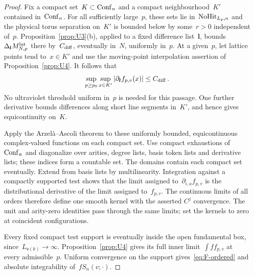 \begin{proof}
Fix a compact set~$K\subset\mathrm{Conf}_{n}$ and a compact neighbourhood~$K'$ contained in~$\mathrm{Conf}_{n}$. For all sufficiently large~$p$, these sets lie in~$\mathrm{NoHit}_{L_p,n}$ and the physical torus separation on~$K'$ is bounded below by some~$r>0$ independent of~$p$. Proposition~\ref{prop:U3}(b), applied to a fixed difference list~$\boldsymbol l$, bounds~$\Delta_{\boldsymbol l}M^{\mathrm{lat}}_{N,p}$ there by~$C_{\rm diff}$, eventually in~$N$, uniformly in~$p$. At a given~$p$, let lattice points tend to~$x\in K'$ and use the moving-point interpolation assertion of Proposition~\ref{prop:U4}. It follows that
\begin{equation}\label{eq:F-local-bounds}
\sup_{p\ge p_0}\sup_{x\in K'}|\partial_{\boldsymbol l}f_{p,v}(x)|\le C_{\rm diff}\,.
\end{equation}
No ultraviolet threshold uniform in~$p$ is needed for this passage. One further derivative bounds differences along short line segments in~$K'$, and hence gives equicontinuity on~$K$.

Apply the Arzelà--Ascoli theorem to these uniformly bounded, equicontinuous complex-valued functions on each compact set. Use compact exhaustions of~$\mathrm{Conf}_{n}$ and diagonalize over arities, degree lists, basis token lists and derivative lists; these indices form a countable set. The domains contain each compact set eventually. Extend from basis lists by multilinearity. Integration against a compactly supported test shows that the limit assigned to~$\partial_{i,a}f_{p,v}$ is the distributional derivative of the limit assigned to~$f_{p,v}$. The continuous limits of all orders therefore define one smooth kernel with the asserted $C^j$ convergence. The unit and arity-zero identities pass through the same limits; set the kernels to zero at coincident configurations.

Every fixed compact test support is eventually inside the open fundamental box, since~$L_{\mathsf v(k)}\to\infty$. Proposition~\ref{prop:U4} gives its full inner limit~$\int f f_{p,v}$ at every admissible~$p$. Uniform convergence on the support gives~\eqref{eq:F-ordered} and absolute integrability of~$fS_n(v;\cdot)$.
\end{proof}


